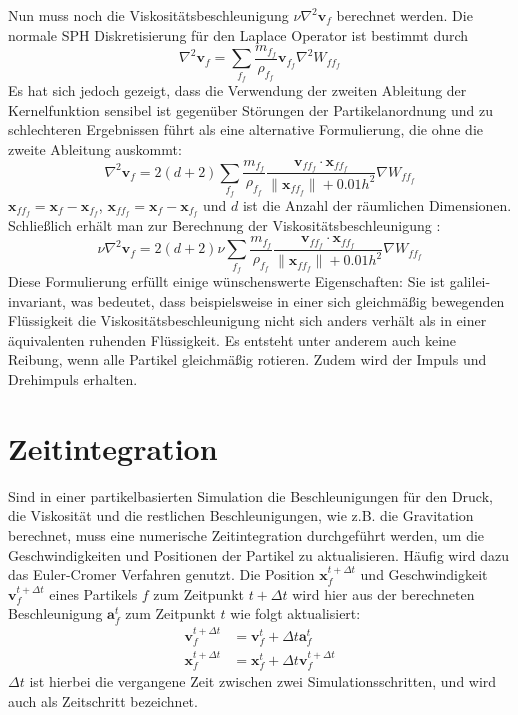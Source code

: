 \documentclass{scrreprt}
\begin{document}
Nun muss noch die Viskositätsbeschleunigung $\nu \nabla^2 \textbf{v}_f$ berechnet werden.
Die normale SPH Diskretisierung für den Laplace Operator ist bestimmt durch
\begin{equation}
    \nabla^2 \textbf{v}_f = \sum_{f_f} \frac{m_{f_f}}{\rho_{f_f}} \textbf{v}_{f_f} \nabla^2 W_{ff_f}
\end{equation}
Es hat sich jedoch gezeigt,
dass die Verwendung der zweiten Ableitung der Kernelfunktion sensibel ist gegenüber Störungen der Partikelanordnung
und zu schlechteren Ergebnissen führt als eine alternative Formulierung, die ohne die zweite Ableitung auskommt:
\begin{equation}
    \nabla^2 \textbf{v}_f = 2(d + 2) \sum_{f_f} \frac{m_{f_f}}{\rho_{f_f}} \frac{\textbf{v}_{ff_f} \cdot \textbf{x}_{ff_f}}{\|\textbf{x}_{ff_f}\| + 
    0.01h^2} \nabla W_{ff_f}
\end{equation}
$\textbf{x}_{ff_f} = \textbf{x}_f - \textbf{x}_{f_f}$, $\textbf{x}_{ff_f} = \textbf{x}_f - \textbf{x}_{f_f}$ und $d$ ist die Anzahl der räumlichen Dimensionen.
Schließlich erhält man zur Berechnung der Viskositätsbeschleunigung \cite{koschier_smoothed_2020}:
\begin{equation}
    \nu \nabla^2 \textbf{v}_f = 2(d + 2) \nu \sum_{f_f} \frac{m_{f_f}}{\rho_{f_f}} \frac{\textbf{v}_{ff_f} \cdot \textbf{x}_{ff_f}}{\|\textbf{x}_{ff_f}\| + 
    0.01h^2} \nabla W_{ff_f}
\end{equation}
Diese Formulierung erfüllt einige wünschenswerte Eigenschaften:
Sie ist galilei-invariant, was bedeutet, dass beispielsweise in einer sich gleichmäßig bewegenden Flüssigkeit
die Viskositätsbeschleunigung nicht sich anders verhält als in einer äquivalenten ruhenden Flüssigkeit.
Es entsteht unter anderem auch keine Reibung, wenn alle Partikel gleichmäßig rotieren.
Zudem wird der Impuls und Drehimpuls erhalten.


\section{Zeitintegration}
Sind in einer partikelbasierten Simulation die Beschleunigungen für den Druck, die Viskosität und die restlichen Beschleunigungen, wie z.B. die Gravitation berechnet,
muss eine numerische Zeitintegration durchgeführt werden, um die Geschwindigkeiten und Positionen der Partikel zu aktualisieren.
Häufig wird dazu das Euler-Cromer Verfahren genutzt. \cite{koschier_smoothed_2020}
Die Position $\textbf{x}_f^{t + \Delta t}$ und Geschwindigkeit $\textbf{v}_f^{t + \Delta t}$ eines Partikels $f$ zum Zeitpunkt $t + \Delta t$ 
wird hier aus der berechneten Beschleunigung $\textbf{a}_f^t$ zum Zeitpunkt $t$ wie folgt aktualisiert:
\begin{align}
    \textbf{v}_f^{t + \Delta t} &= \textbf{v}_f^t + \Delta t \textbf{a}_f^t\\
    \textbf{x}_f^{t + \Delta t} &= \textbf{x}_f^t + \Delta t \textbf{v}_f^{t + \Delta t}
\end{align}
$\Delta t$ ist hierbei die vergangene Zeit zwischen zwei Simulationsschritten, und wird auch als Zeitschritt bezeichnet.
\end{document}
